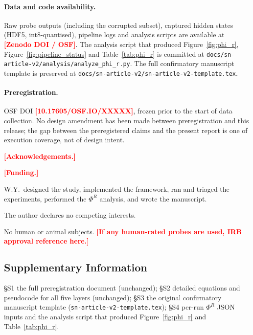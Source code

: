 \documentclass[pdflatex,sn-mathphys-num]{sn-jnl}
\newcommand{\PLACE}[1]{\textcolor{red}{\textbf{[#1]}}}
\theoremstyle{thmstyleone}
\theoremstyle{thmstylethree}
\begin{document}
\paragraph{Data and code availability.} Raw probe outputs (including the corrupted subset), captured hidden states (HDF5, int8-quantised), pipeline logs and analysis scripts are available at \PLACE{Zenodo DOI / OSF}. The analysis script that produced Figure~\ref{fig:phi_r}, Figure~\ref{fig:pipeline_status} and Table~\ref{tab:phi_r} is committed at \texttt{docs/sn-article-v2/analysis/analyze\_phi\_r.py}. The full confirmatory manuscript template is preserved at \texttt{docs/sn-article-v2/sn-article-v2-template.tex}.

\paragraph{Preregistration.} OSF DOI \PLACE{10.17605/OSF.IO/XXXXX}, frozen prior to the start of data collection. No design amendment has been made between preregistration and this release; the gap between the preregistered claims and the present report is one of execution coverage, not of design intent.

\backmatter

\PLACE{Acknowledgements.}

\PLACE{Funding.}

W.Y.\ designed the study, implemented the framework, ran and triaged the experiments, performed the $\Phi^R$ analysis, and wrote the manuscript.

The author declares no competing interests.

No human or animal subjects. \PLACE{If any human-rated probes are used, IRB approval reference here.}

\begin{appendices}

\section*{Supplementary Information}
\S S1 the full preregistration document (unchanged); \S S2 detailed equations and pseudocode for all five layers (unchanged); \S S3 the original confirmatory manuscript template (\texttt{sn-article-v2-template.tex}); \S S4 per-run $\Phi^R$ JSON inputs and the analysis script that produced Figure~\ref{fig:phi_r} and Table~\ref{tab:phi_r}.

\end{appendices}



\end{document}
